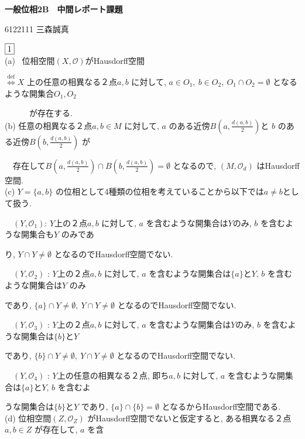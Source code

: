 \documentclass{jsarticle}
\begin{document}
\textbf{一般位相2B　中間レポート課題}
\begin{flushright}
6122111 三森誠真
\end{flushright}
$\fbox{1}$ \\
(a) \ 位相空間$(X, \mathcal{O})$がHausdorff空間

$\stackrel{\mathrm{def}}{\Longleftrightarrow} X$ 上の任意の相異なる２点$a,b$ に対して, $a \in O_1, \ b \in O_2, \ O_1 \cap O_2 = \emptyset$ となるような開集合$O_1, O_2$

\ \ \ \ \ \ が存在する. \\
(b) 任意の相異なる２点$a,b \in M$ に対して, $a$ のある近傍$B\left(a,\displaystyle \frac{d(a,b)}{2}\right)$と $b$ のある近傍$B\left(b,\displaystyle \frac{d(a,b)}{2}\right)$ が

\ \ 存在して$B\left(a,\displaystyle \frac{d(a,b)}{2}\right) \cap B\left(b,\displaystyle \frac{d(a,b)}{2}\right) = \emptyset$ となるので, $(M,\mathcal{O}_d)$ はHausdorff空間.\\
(c) $Y = \{a,b\}$ の位相として4種類の位相を考えていることから以下では$a \neq b$として扱う.

\ \ $(Y,\mathcal{O}_1)$: $Y$上の２点$a,b$ に対して, $a$ を含むような開集合は$Y$のみ, $b$ を含むような開集合も$Y$ のみであ

\hspace{5zw}り, $Y \cap Y \neq \emptyset$ となるのでHausdorff空間でない. 

\ \ $(Y,\mathcal{O}_2)$ : $Y$上の２点$a,b$ に対して, $a$ を含むような開集合は$\{a\}とY$, $b$ を含むような開集合は$Y$ のみ

\hspace{5zw}であり, $\{a\} \cap Y \neq \emptyset, \ Y \cap Y \neq \emptyset$ となるのでHausdorff空間でない.

\ \ $(Y,\mathcal{O}_3)$ : $Y$上の２点$a,b$ に対して, $a$ を含むような開集合は$Y$のみ, $b$ を含むような開集合は$\{b\}とY$

\hspace{5zw}であり, $\{b\} \cap Y \neq \emptyset, \ Y \cap Y \neq \emptyset$ となるのでHausdorff空間でない.

\ \ $(Y,\mathcal{O}_4)$ : $Y$上の任意の相異なる２点, 即ち$a,b$ に対して, $a$ を含むような開集合は$\{a\}とY$, $b$ を含むよ

\hspace{5zw}うな開集合は$\{b\}とY$ であり, $\{a\} \cap \{b\} = \emptyset$ となるからHausdorff空間である. \\
(d) 位相空間$(Z,\mathcal{O}_Z)$ がHausdorff空間でないと仮定すると, ある相異なる２点$a,b \in Z$ が存在して, $a$ を含
\end{document}
